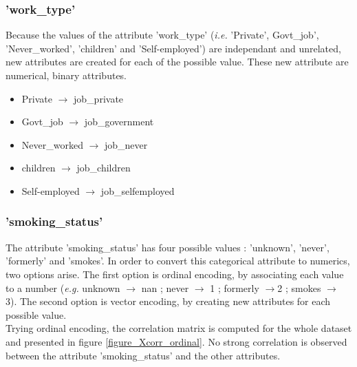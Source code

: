 \subsubsection{'work\_type'}
Because the values of the attribute 'work\_type' (\textit{i.e.} 'Private', Govt\_job', 
'Never\_worked', 'children' and 'Self-employed') are independant and unrelated, new attributes are 
created for each of the possible value. These new attribute are numerical, binary attributes.
\begin{itemize}
 \item Private $\rightarrow$ job\_private  
 \item Govt\_job $\rightarrow$ job\_government
 \item Never\_worked $\rightarrow$ job\_never
 \item children $\rightarrow$ job\_children
 \item Self-employed $\rightarrow$ job\_selfemployed
\end{itemize} 

\subsubsection{'smoking\_status'}
The attribute 'smoking\_status' has four possible values : 'unknown', 'never', 'formerly' and 
'smokes'. In order to convert this categorical attribute to numerics, two options arise. The first 
option is ordinal encoding, by associating each value to a number (\textit{e.g.} unknown 
$\rightarrow$ nan ; never $\rightarrow$ 1 ; formerly $\rightarrow$2 ; smokes $\rightarrow$ 3). The 
second option is vector encoding, by creating new attributes for each possible value.\\

Trying ordinal encoding, the correlation matrix is computed for the whole dataset and presented in 
figure \ref{figure_Xcorr_ordinal}. No strong correlation is observed between the attribute 
'smoking\_status' and the other attributes.

